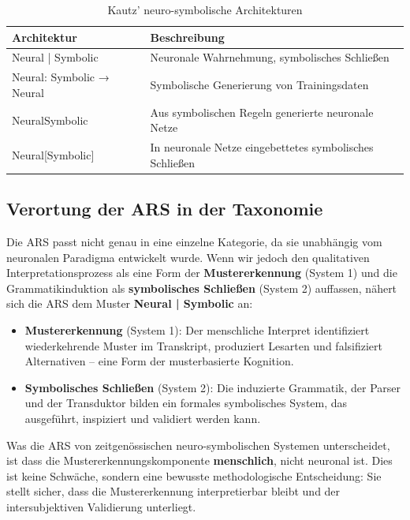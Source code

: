 \documentclass[12pt,a4paper]{article}
\begin{document}
\begin{table}[H]
\centering
\caption{Kautz' neuro-symbolische Architekturen}
\label{tab:kautz}
\begin{tabular}{@{} p{4cm} p{8cm} @{}}
\toprule
\textbf{Architektur} & \textbf{Beschreibung} \\
\midrule
Neural | Symbolic & Neuronale Wahrnehmung, symbolisches Schließen \\
Neural: Symbolic → Neural & Symbolische Generierung von Trainingsdaten \\
NeuralSymbolic & Aus symbolischen Regeln generierte neuronale Netze \\
Neural[Symbolic] & In neuronale Netze eingebettetes symbolisches Schließen \\
\bottomrule
\end{tabular}
\end{table}

\subsection{Verortung der ARS in der Taxonomie}

Die ARS passt nicht genau in eine einzelne Kategorie, da sie unabhängig vom 
neuronalen Paradigma entwickelt wurde. Wenn wir jedoch den qualitativen 
Interpretationsprozess als eine Form der \textbf{Mustererkennung} (System 1) 
und die Grammatikinduktion als \textbf{symbolisches Schließen} (System 2) 
auffassen, nähert sich die ARS dem Muster \textbf{Neural | Symbolic} an:

\begin{itemize}
    \item \textbf{Mustererkennung} (System 1): Der menschliche Interpret 
    identifiziert wiederkehrende Muster im Transkript, produziert Lesarten 
    und falsifiziert Alternativen – eine Form der musterbasierte Kognition.
    \item \textbf{Symbolisches Schließen} (System 2): Die induzierte Grammatik, 
    der Parser und der Transduktor bilden ein formales symbolisches System, das 
    ausgeführt, inspiziert und validiert werden kann.
\end{itemize}

Was die ARS von zeitgenössischen neuro-symbolischen Systemen unterscheidet, ist 
dass die Mustererkennungskomponente \textbf{menschlich}, nicht neuronal ist. 
Dies ist keine Schwäche, sondern eine bewusste methodologische Entscheidung: 
Sie stellt sicher, dass die Mustererkennung interpretierbar bleibt und der 
intersubjektiven Validierung unterliegt.
\end{document}
